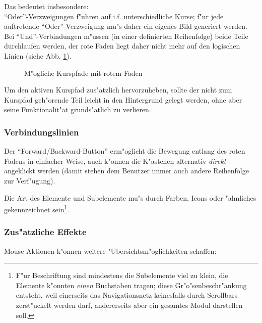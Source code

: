 Das bedeutet insbesondere: \\
``Oder''-Verzweigungen f"uhren auf i.f. unterschiedliche Kurse; f"ur
jede auftretende ``Oder''-Verzweigung mu"s daher ein eigenes Bild
generiert werden.\\
Bei ``Und''-Verbindungen m"ussen (in einer definierten Reihenfolge) beide
Teile durchlaufen werden, der rote Faden liegt daher nicht mehr auf
den logischen Linien (siehe Abb. \ref{kurs_mit_rotem_faden}).

\begin{figure}[h]
\begin{center}
\caption{M"ogliche Kurspfade mit rotem Faden}\label{kurs_mit_rotem_faden}
\end{center}
\end{figure}

Um den aktiven Kurspfad zus"atzlich hervorzuheben, sollte der nicht
zum Kurspfad geh"orende Teil leicht in den Hintergrund gelegt werden,
ohne aber seine Funktionalit"at grunds"atlich zu verlieren.







\subsubsection{Verbindungslinien}\label{}


Der ``Forward/Backward-Button'' erm"oglicht die Bewegung entlang des
roten Fadens in einfacher Weise, 
auch k"onnen die K"astchen alternativ \textit{direkt} angeklickt werden
(damit stehen dem Benutzer immer auch andere Reihenfolge zur 
Verf"ugung).

Die Art des Elemente und Subelemente mu"s durch Farben, Icons oder
"ahnliches gekennzeichnet sein\footnote{F"ur Beschriftung sind
mindestens die Subelemente viel zu klein, die Elemente k"onnten
\textit{einen} Buchstaben tragen; diese Gr"o"senbeschr"ankung
entsteht, weil einerseits das Navigationsnetz keinesfalls durch
Scrollbars zerst"uckelt werden darf, andererseits aber ein gesamtes
Modul darstellen soll.}.


\subsubsection{Zus"atzliche Effekte}\label{navi_netz_zusaetzliche_effekte}

Mouse-Aktionen k"onnen weitere "Ubersichtsm"oglichkeiten schaffen:

